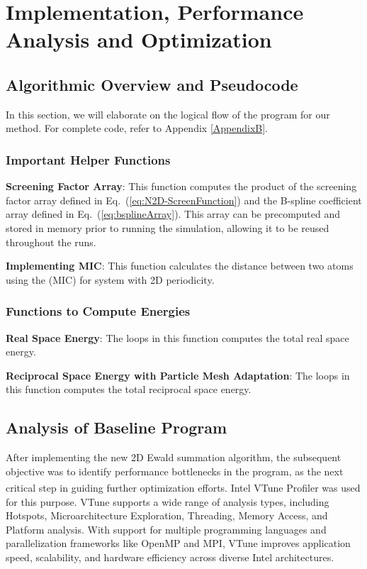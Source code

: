 \chapter{Implementation, Performance Analysis and Optimization}
\label{Chapter5}

\section{Algorithmic Overview and Pseudocode}

In this section, we will elaborate on the logical flow of the program for our method. For complete code, refer to Appendix \ref{AppendixB}. 
\subsection{Important Helper Functions}
\textbf{Screening Factor Array}: This function computes the product of the screening factor array defined in Eq.~(\ref{eq:N2D-ScreenFunction}) and the B-spline coefficient array defined in Eq.~(\ref{eq:bsplineArray}). This array can be precomputed and stored in memory prior to running the simulation, allowing it to be reused throughout the runs.


\textbf{Implementing \ac{MIC}}: This function calculates the distance between two atoms using the  (\ac{MIC}) for system with 2D periodicity.


\subsection{Functions to Compute Energies}
\textbf{Real Space Energy}: The loops in this function computes the total real space energy. 


\textbf{Reciprocal Space Energy with Particle Mesh Adaptation}: The loops in this function computes the total reciprocal space energy. 


\section{Analysis of Baseline Program}

After implementing the new 2D Ewald summation algorithm, the subsequent objective was to identify performance bottlenecks in the program, as the next critical step in guiding further optimization efforts. Intel\textsuperscript{\textregistered} VTune\texttrademark{} Profiler was used for this purpose. VTune supports a wide range of analysis types, including Hotspots, Microarchitecture Exploration, Threading, Memory Access, and Platform analysis. With support for multiple programming languages and parallelization frameworks like OpenMP and MPI, VTune improves application speed, scalability, and hardware efficiency across diverse Intel architectures. 

